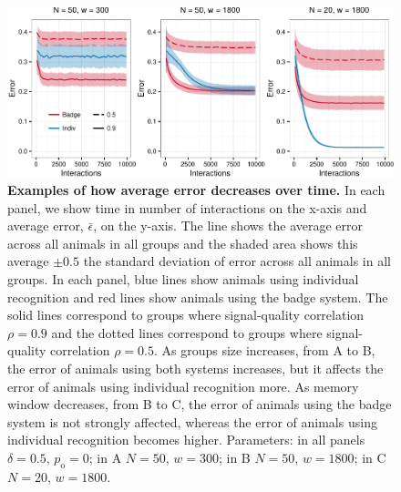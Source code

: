 \begin{figure}

\includegraphics[width=.95\textwidth]{figures/learning_curves.pdf}
\caption{\label{learning_curves} \sffamily\small\textbf{Examples of how average error decreases over time.}
In each panel, we show time in number of interactions on the x-axis and average error, $\bar{\epsilon}$, on the y-axis. The line shows the average error across all animals in all groups and the shaded area shows this average $\pm 0.5$ the standard deviation of error across all animals in all groups. In each panel, blue lines show animals using individual recognition and red lines show animals using the badge system. The solid lines correspond to groups where signal-quality correlation $\rho=0.9$ and the dotted lines correspond to groups where signal-quality correlation $\rho=0.5$. As groups size increases, from A to B, the error of animals using both systems increases, but it affects the error of animals using individual recognition more. As memory window decreases, from B to C, the error of animals using the badge system is not strongly affected, whereas the error of animals using individual recognition becomes higher. Parameters: in all panels $\delta = 0.5$, $p_\text{o}=0$; in A $N=50$, $w=300$; in B $N=50$, $w=1800$; in C $N=20$, $w=1800$. }
\end{figure}


